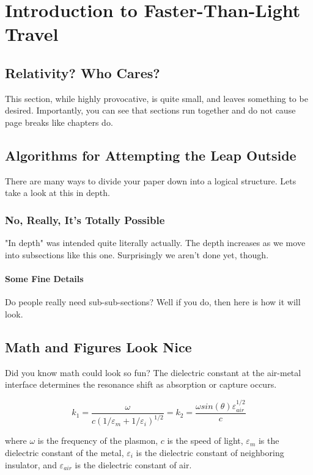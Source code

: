 \chapter{Introduction to Faster-Than-Light Travel}

\section{Relativity? Who Cares?}
This section, while highly provocative, is quite small, and leaves something to be desired. Importantly, you can see that sections run together and do not cause page breaks like chapters do.

\section{Algorithms for Attempting the Leap Outside}
There are many ways to divide your paper down into a logical structure. Lets take a look at this in depth.

\subsection{No, Really, It's Totally Possible}
"In depth" was intended quite literally actually. The depth increases as we move into subsections like this one. Surprisingly we aren't done yet, though.

\subsubsection{Some Fine Details}
Do people really need sub-sub-sections? Well if you do, then here is how it will look.

\section{Math and Figures Look Nice}
Did you know math could look so fun? The dielectric constant at the air-metal interface
determines the resonance shift as absorption or capture occurs.

\begin{equation}
k_1=\frac{\omega }{c({1/\varepsilon_m + 1/\varepsilon_i})^{1/2}}=k_2=\frac{\omega
sin(\theta)\varepsilon_{air}^{1/2}}{c}
\end{equation}

\noindent
where $\omega$ is the frequency of the plasmon, $c$ is the speed of
light, $\varepsilon_m$ is the dielectric constant of the metal,
$\varepsilon_i$ is the dielectric constant of neighboring insulator,
and $\varepsilon_{air}$ is the dielectric constant of air.

